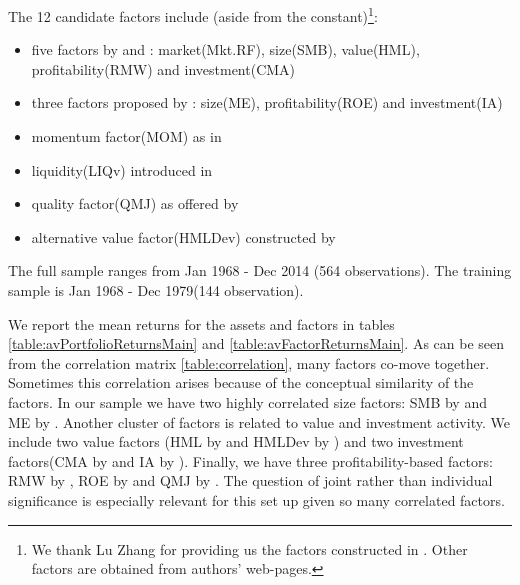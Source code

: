 The 12 candidate factors include (aside from the constant)\footnote{We thank Lu Zhang for providing us the factors constructed in \cite{hou2014digesting}. Other factors are obtained from authors' web-pages.}:
\begin{itemize}
	\item five factors by \cite{fama1993common} and \cite{fama2015five}: market(Mkt.RF), size(SMB), value(HML), profitability(RMW) and investment(CMA)
	\item three factors proposed by \cite{hou2014digesting}: size(ME), profitability(ROE) and investment(IA)
	\item momentum factor(MOM) as in \cite{carhart1997persistence}
	\item liquidity(LIQv) introduced in \cite{stambaugh2003liquidity}
	\item quality factor(QMJ) as offered by \cite{asness2014quality}
	\item alternative value factor(HMLDev) constructed by \cite{asness2013devil}
\end{itemize}
The full sample ranges from Jan 1968 - Dec 2014 (564 observations). The training sample is Jan 1968 - Dec 1979(144 observation). 

We report the mean returns for the assets and factors in tables \ref{table:avPortfolioReturnsMain} and \ref{table:avFactorReturnsMain}. As can be seen from the correlation matrix \ref{table:correlation}, many factors co-move together. 
Sometimes this correlation arises because of the conceptual similarity of the factors. 
In our sample we have two highly correlated size factors: SMB by \cite{fama2015five} and ME by \cite{hou2014digesting}. Another cluster of factors is related to value and investment activity. 
We include two value factors (HML by \cite{fama2015five} and HMLDev by \cite{asness2013devil}) and two investment factors(CMA by \cite{fama2015five} and IA by \cite{hou2014digesting}). 
Finally, we have three profitability-based factors: RMW by \cite{fama2015five}, ROE by \cite{hou2014digesting} and QMJ by \cite{asness2014quality}.  
The question of joint rather than individual significance is especially relevant for this set up given so many correlated factors. 

